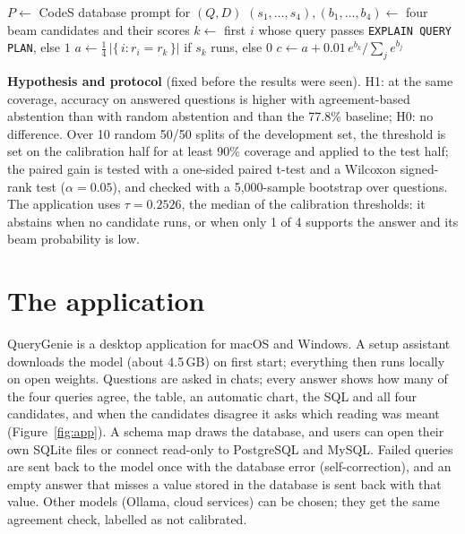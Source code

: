 \begin{algorithm}[!t]
	\SetAlgoLined
	$P \leftarrow$ CodeS database prompt for $(Q, D)$\;
	$(s_1, \dots, s_4), (b_1, \dots, b_4) \leftarrow$ four beam candidates and their scores\;
	$k \leftarrow$ first $i$ whose query passes \texttt{EXPLAIN QUERY PLAN}, else $1$\;
	$a \leftarrow \frac{1}{4}\,\lvert\{\, i : r_i = r_k \,\}\rvert$ if $s_k$ runs, else $0$\;
	$c \leftarrow a + 0.01\, e^{b_k} / \sum_j e^{b_j}$\;
	\caption{Confidence-aware abstention on top of CodeS}
	\label{alg:abstain}
\end{algorithm}

\textbf{Hypothesis and protocol} (fixed before the results were seen). H1: at the same coverage, accuracy on answered questions is higher with agreement-based abstention than with random abstention and than the 77.8\% baseline; H0: no difference. Over 10 random 50/50 splits of the development set, the threshold is set on the calibration half for at least 90\% coverage and applied to the test half; the paired gain is tested with a one-sided paired t-test and a Wilcoxon signed-rank test ($\alpha = 0.05$), and checked with a 5,000-sample bootstrap over questions. The application uses $\tau = 0.2526$, the median of the calibration thresholds: it abstains when no candidate runs, or when only 1 of 4 supports the answer and its beam probability is low.

\section{The application}

QueryGenie is a desktop application for macOS and Windows. A setup assistant downloads the model (about 4.5\,GB) on first start; everything then runs locally on open weights. Questions are asked in chats; every answer shows how many of the four queries agree, the table, an automatic chart, the SQL and all four candidates, and when the candidates disagree it asks which reading was meant (Figure~\ref{fig:app}). A schema map draws the database, and users can open their own SQLite files or connect read-only to PostgreSQL and MySQL. Failed queries are sent back to the model once with the database error (self-correction), and an empty answer that misses a value stored in the database is sent back with that value. Other models (Ollama, cloud services) can be chosen; they get the same agreement check, labelled as not calibrated.

